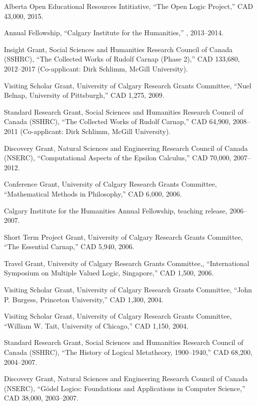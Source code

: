 \documentclass[11pt]{article}
\begin{document}
\ind Alberta Open Educational Resources Intitiative, ``The Open Logic Project,'' CAD 43,000, 2015.

\ind Annual Fellowship, ``Calgary Institute for the Humanities,'' , 2013--2014.

\ind Insight Grant, Social Sciences and Humanities Research Council of Canada
(SSHRC), ``The Collected Works of Rudolf Carnap (Phase 2),'' CAD 133,680, 2012--2017 (Co-applicant: Dirk Schlimm, McGill University).

\ind Visiting Scholar Grant, University of Calgary Research Grants Committee, ``Nuel Belnap, University of Pittsburgh,'' CAD 1,275, 2009.

\ind Standard Research Grant, Social Sciences and Humanities Research Council
of Canada (SSHRC), ``The Collected Works of Rudolf Carnap,'' CAD 64,900, 2008--2011 (Co-applicant: Dirk Schlimm, McGill University).

\ind Discovery Grant, Natural Sciences and Engineering Research Council of
Canada (NSERC), ``Computational Aspects of the Epsilon Calculus,'' CAD 70,000, 2007--2012.

\ind Conference Grant, University of Calgary Research Grants Committee, ``Mathematical Methods in Philosophy,'' CAD 6,000, 2006.

\ind Calgary Institute for the Humanities Annual Fellowship, teaching release, 2006--2007.

\ind Short Term Project Grant, University of Calgary Research Grants
Committee, ``The Essential Carnap,'' CAD 5,940, 2006.

\ind Travel Grant, University of Calgary Research Grants Committee,, ``International Symposium on Multiple Valued Logic, Singapore,'' CAD 1,500, 2006.

\ind Visiting Scholar Grant, University of Calgary Research Grants Committee, ``John P. Burgess, Princeton University,'' CAD 1,300, 2004.

\ind Visiting Scholar Grant, University of Calgary Research Grants Committee, ``William W. Tait, University of Chicago,'' CAD 1,150, 2004.

\ind Standard Research Grant, Social Sciences and Humanities Research Council
of Canada (SSHRC), ``The History of Logical Metatheory, 1900--1940,'' CAD 68,200, 2004--2007.

\ind Discovery Grant, Natural Sciences and Engineering Research Council of
Canada (NSERC), ``Gödel Logics: Foundations and Applications in Computer Science,'' CAD 38,000, 2003--2007.
\end{document}
